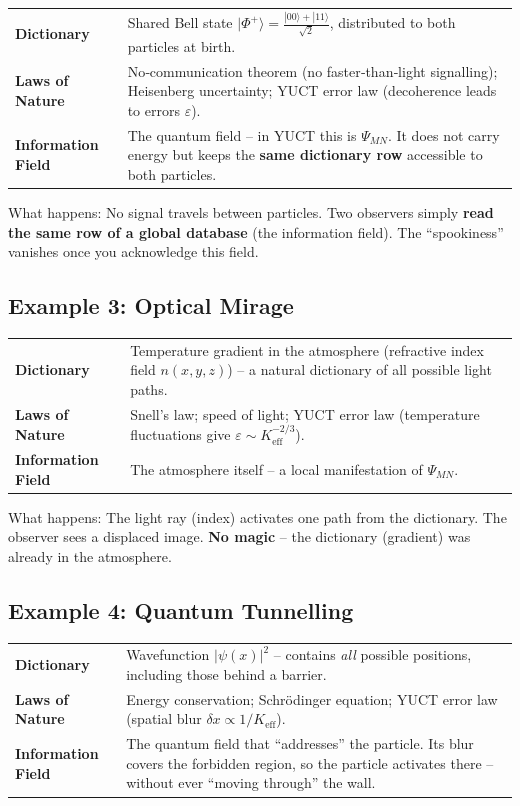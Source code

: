 \documentclass[12pt,a4paper]{article}
\begin{document}
	\begin{tabular}{p{2.8cm} p{10cm}}
		\textbf{Dictionary} & Shared Bell state \(|\Phi^+\rangle = \frac{|00\rangle + |11\rangle}{\sqrt{2}}\), distributed to both particles at birth. \\
		\textbf{Laws of Nature} & No‑communication theorem (no faster‑than‑light signalling); Heisenberg uncertainty; YUCT error law (decoherence leads to errors \(\varepsilon\)). \\
		\textbf{Information Field} & The quantum field -- in YUCT this is \(\Psi_{MN}\). It does not carry energy but keeps the \textbf{same dictionary row} accessible to both particles. \\
	\end{tabular}
	
	\noindent What happens: No signal travels between particles. Two observers simply \textbf{read the same row of a global database} (the information field). The ``spookiness'' vanishes once you acknowledge this field.
	
	\subsection{Example 3: Optical Mirage}
	
	\begin{tabular}{p{2.8cm} p{10cm}}
		\textbf{Dictionary} & Temperature gradient in the atmosphere (refractive index field \(n(x,y,z)\)) -- a natural dictionary of all possible light paths. \\
		\textbf{Laws of Nature} & Snell's law; speed of light; YUCT error law (temperature fluctuations give \(\varepsilon \sim K_{\mathrm{eff}}^{-2/3}\)). \\
		\textbf{Information Field} & The atmosphere itself -- a local manifestation of \(\Psi_{MN}\). \\
	\end{tabular}
	
	\noindent What happens: The light ray (index) activates one path from the dictionary. The observer sees a displaced image. \textbf{No magic} -- the dictionary (gradient) was already in the atmosphere.
	
	\subsection{Example 4: Quantum Tunnelling}
	
	\begin{tabular}{p{2.8cm} p{10cm}}
		\textbf{Dictionary} & Wavefunction \(|\psi(x)|^2\) -- contains \emph{all} possible positions, including those behind a barrier. \\
		\textbf{Laws of Nature} & Energy conservation; Schrödinger equation; YUCT error law (spatial blur \(\delta x \propto 1/K_{\mathrm{eff}}\)). \\
		\textbf{Information Field} & The quantum field that ``addresses'' the particle. Its blur covers the forbidden region, so the particle activates there -- without ever ``moving through'' the wall. \\
	\end{tabular}
	
\end{document}
